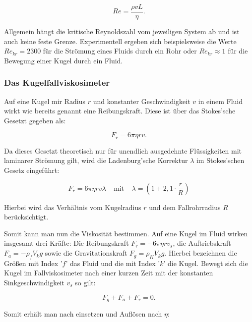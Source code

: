 \documentclass{article}
\begin{document}
\begin{equation}
    Re = \frac{\rho v L}{\eta}.
    \label{eq:Reynolds_L}
\end{equation}

Allgemein hängt die kritische Reynoldszahl vom jeweiligen System ab und ist auch keine feste Grenze. Experimentell ergeben sich beispielsweise die Werte $Re_{kr} =2300$ für die Strömung eines Fluids durch ein Rohr oder $Re_{kr} \approx 1$ für die Bewegung einer Kugel durch ein Fluid.

\subsubsection{Das Kugelfallviskosimeter}

Auf eine Kugel mir Radius $r$ und konstanter Geschwindigkeit $v$ in einem Fluid wirkt wie bereits genannt eine Reibungskraft. Diese ist über das Stokes'sche Gesetzt gegeben als:

\begin{equation}
    F_r = 6 \pi \eta r v.
    \label{eq:stokes}
\end{equation}

Da dieses Gesetzt theoretisch nur für unendlich ausgedehnte Flüssigkeiten mit laminarer Strömung gilt, wird die Ladenburg'sche Korrektur $\lambda$ im Stokes'schen Gesetz eingeführt:

\begin{equation}
    F_r = 6 \pi \eta r v \lambda \ \ \ \ \ \text{mit} \ \ \ \ \ \lambda = \left( 1 + 2,1 \cdot \frac{r}{R} \right)
    \label{eq:ladenburg}
\end{equation}

Hierbei wird das Verhältnis vom Kugelradius $r$ und dem Fallrohrradius $R$ berücksichtigt.

Somit kann man nun die Viskosität bestimmen. Auf eine Kugel im Fluid wirken insgesamt drei Kräfte: Die Reibungskraft $F_r = -6 \pi \eta r v_s$, die Auftriebskraft $F_a = - \rho_f V_k g$ sowie die Gravitationskraft $F_g = \rho_K V_k g$. Hierbei bezeichnen die Größen mit Index '$f$' das Fluid und die mit Index '$k$' die Kugel. Bewegt sich die Kugel im Fallviskosimeter nach einer kurzen Zeit mit der konstanten Sinkgeschwindigkeit $v_s$ so gilt:

\begin{equation}
    F_g + F_a + F_r = 0.
\end{equation}

Somit erhält man nach einsetzen und Auflösen nach $\eta$:
\end{document}
